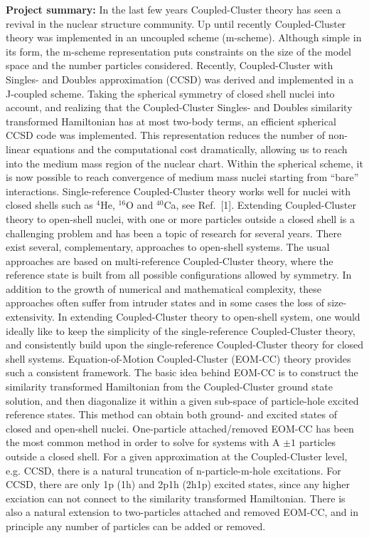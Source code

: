 \documentclass[prl,preprint]{revtex4}
\begin{document}
{\bf Project summary:}
In the last few years Coupled-Cluster theory has seen a revival in 
the nuclear structure community. Up until recently Coupled-Cluster 
theory was implemented in an uncoupled scheme (m-scheme). 
Although simple in its form, the m-scheme representation puts
constraints on the size of the model space
and the number particles considered. Recently, Coupled-Cluster with Singles- and Doubles approximation (CCSD)
was derived and implemented in a J-coupled scheme. Taking the spherical 
symmetry of closed shell nuclei into account, and realizing that the
Coupled-Cluster Singles- and Doubles similarity transformed
Hamiltonian has at most two-body terms, an efficient spherical CCSD code was implemented. This 
representation reduces the number of non-linear equations and  the computational cost dramatically, 
allowing us to reach into the medium mass region of the nuclear
chart. 
Within the spherical scheme, it is now 
possible to reach convergence of medium mass nuclei starting from ``bare'' interactions. 
Single-reference Coupled-Cluster theory works well for nuclei with closed shells such as $^4$He, $^{16}$O
and $^{40}$Ca, see Ref.~[1]. Extending Coupled-Cluster theory to open-shell nuclei, with one or more particles outside
a closed shell is a challenging problem and has been a topic of research for several years. There
exist several, complementary, approaches to open-shell systems. The usual approaches are based on 
multi-reference Coupled-Cluster theory, where the reference state is
built from all possible configurations allowed by symmetry. In addition
to the growth of numerical and mathematical complexity, these approaches often suffer from intruder
states and in some cases the loss of size-extensivity. In extending
Coupled-Cluster theory to open-shell system, one would ideally like to keep
the simplicity of the single-reference Coupled-Cluster theory, and 
consistently build upon the single-reference
Coupled-Cluster theory for closed shell systems. Equation-of-Motion 
Coupled-Cluster (EOM-CC) theory
provides such a consistent framework. The basic idea behind EOM-CC is
to construct the similarity transformed Hamiltonian from the
Coupled-Cluster ground state solution, and then diagonalize it within
a given sub-space of particle-hole excited reference states. This
method can obtain both ground- and excited states of closed and
open-shell nuclei. One-particle attached/removed EOM-CC has been the 
most common method in order to solve for systems with A $\pm 1$
particles outside a closed shell. For a given approximation at the
Coupled-Cluster level, e.g. CCSD, there is a natural truncation of
n-particle-m-hole excitations. For CCSD, there are only 1p (1h) and
2p1h (2h1p) excited states, since any higher exciation can not connect
to the similarity transformed Hamiltonian. There is also a natural
extension to two-particles attached and removed EOM-CC, and in
principle any number of particles can be added or removed. 
\end{document}
